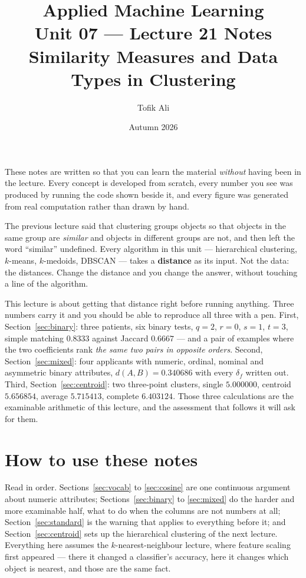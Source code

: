 \documentclass[11pt]{article}
\title{Applied Machine Learning\\Unit 07 --- Lecture 21 Notes\\
       Similarity Measures and Data Types in Clustering}
\author{Tofik Ali}
\date{Autumn 2026}
\begin{document}
\maketitle

\begin{keyidea}
These notes are written so that you can learn the material \emph{without}
having been in the lecture. Every concept is developed from scratch, every
number you see was produced by running the code shown beside it, and every
figure was generated from real computation rather than drawn by hand.

The previous lecture said that clustering groups objects so that objects in
the same group are \emph{similar} and objects in different groups are not,
and then left the word ``similar'' undefined. Every algorithm in this unit
--- hierarchical clustering, $k$-means, $k$-medoids, DBSCAN --- takes a
\textbf{distance} as its input. Not the data: the distances. Change the
distance and you change the answer, without touching a line of the
algorithm.

This lecture is about getting that distance right before running anything.
Three numbers carry it and you should be able to reproduce all three with a
pen. First, Section~\ref{sec:binary}: three patients, six binary tests,
$q=2$, $r=0$, $s=1$, $t=3$, simple matching $0.8333$ against Jaccard
$0.6667$ --- and a pair of examples where the two coefficients rank
\emph{the same two pairs in opposite orders}. Second,
Section~\ref{sec:mixed}: four applicants with numeric, ordinal, nominal and
asymmetric binary attributes, $d(A,B) = \mathbf{0.340686}$ with every
$\delta_f$ written out. Third, Section~\ref{sec:centroid}: two three-point
clusters, single $5.000000$, centroid $5.656854$, average $5.715413$,
complete $6.403124$. Those three calculations are the examinable arithmetic
of this lecture, and the assessment that follows it will ask for them.
\end{keyidea}

\tableofcontents
\medskip

\section{How to use these notes}
\label{sec:how}

Read in order. Sections~\ref{sec:vocab} to \ref{sec:cosine} are one
continuous argument about numeric attributes; Sections~\ref{sec:binary} to
\ref{sec:mixed} do the harder and more examinable half, what to do when the
columns are not numbers at all; Section~\ref{sec:standard} is the warning
that applies to everything before it; and Section~\ref{sec:centroid} sets up
the hierarchical clustering of the next lecture. Everything here assumes the
$k$-nearest-neighbour lecture, where feature scaling first appeared --- there
it changed a classifier's accuracy, here it changes which object is nearest,
and those are the same fact.
\end{document}
